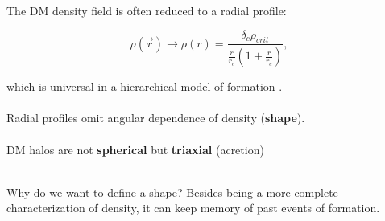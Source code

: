 \documentclass[xcolor=dvipsnames]{beamer}
\begin{document}
\begin{frame}
\small
The DM density field is often reduced to a radial profile:

\begin{equation}
\rho(\vec{r}) \rightarrow \rho(r) = \frac{\delta_c \rho_{crit}}{\frac{r}{r_c}\left( 1 + \frac{r}{r_c}\right)},
\end{equation}

which is universal in a hierarchical model of formation \cite{Navarro1997}.\\~\\

Radial profiles omit angular dependence of density (\textbf{shape}).\\~\\

DM halos are not \textbf{spherical} but \textbf{triaxial} \cite{Allgood2006} (acretion)\\~\\

\begin{block}
{Why do we want to define a shape?}
Besides being a more complete characterization of density, it can keep memory of past events of formation.
\end{block}

\end{frame}
\end{document}
